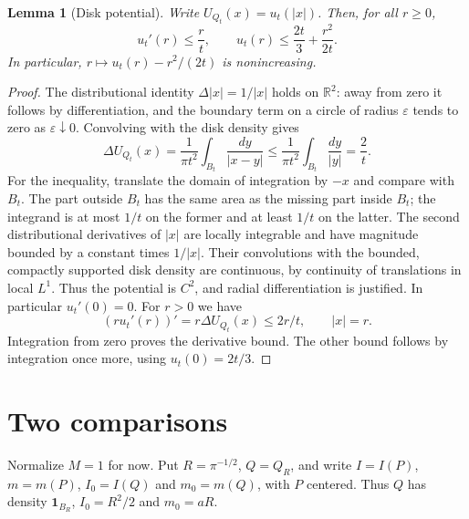 \documentclass[11pt,a4paper]{amsart}
\newtheorem{lemma}[theorem]{Lemma}
\theoremstyle{remark}
\newcommand{\R}{\mathbb R}
\newcommand{\ind}{\mathbf{1}}
\begin{document}
\begin{lemma}[Disk potential]\label{lem:potential}
Write $U_{Q_t}(x)=u_t(|x|)$. Then, for all $r\ge0$,
\begin{equation}\label{eq:radial}
 u_t'(r)\le \frac rt,\qquad
 u_t(r)\le \frac{2t}{3}+\frac{r^2}{2t}.
\end{equation}
In particular, $r\mapsto u_t(r)-r^2/(2t)$ is nonincreasing.
\end{lemma}
\begin{proof}
The distributional identity $\Delta |x|=1/|x|$ holds on $\R^2$:
away from zero it follows by differentiation, and the boundary term
on a circle of radius $\varepsilon$ tends to zero as
$\varepsilon\downarrow0$. Convolving with the disk density gives
\[
 \Delta U_{Q_t}(x)=\frac{1}{\pi t^2}\int_{B_t}\frac{dy}{|x-y|}
 \le \frac{1}{\pi t^2}\int_{B_t}\frac{dy}{|y|}=\frac2t.
\]
For the inequality, translate the domain of integration by $-x$ and
compare with $B_t$. The part outside $B_t$ has the same area as the
missing part inside $B_t$; the integrand is at most $1/t$ on the
former and at least $1/t$ on the latter.
The second distributional derivatives of $|x|$ are locally integrable
and have magnitude bounded by a constant times $1/|x|$. Their
convolutions with the bounded, compactly supported disk density are
continuous, by continuity of translations in local $L^1$. Thus the
potential is $C^2$, and radial differentiation is justified. In
particular $u_t'(0)=0$. For $r>0$ we have
\[
 (ru_t'(r))'=r\Delta U_{Q_t}(x)\le 2r/t,
 \qquad |x|=r.
\]
Integration from zero proves the derivative bound. The other bound
follows by integration once more, using $u_t(0)=2t/3$.
\end{proof}

\section{Two comparisons}
Normalize $M=1$ for now. Put $R=\pi^{-1/2}$, $Q=Q_R$, and write
$I=I(P)$, $m=m(P)$, $I_0=I(Q)$ and $m_0=m(Q)$, with $P$ centered.
Thus $Q$ has density $\ind_{B_R}$, $I_0=R^2/2$ and $m_0=aR$.
\end{document}
